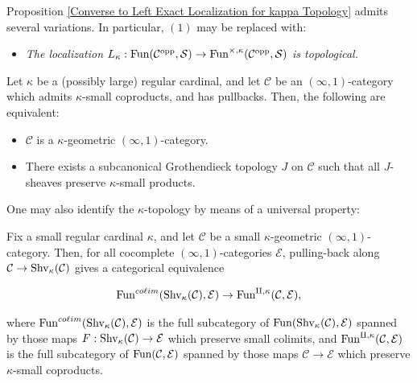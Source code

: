 \documentclass[10pt]{article}
\newcommand{\mS}{\mathcal S}
\newcommand{\C}{\mathcal C}
\newcommand{\cE}{\mathcal{E}}
\theoremstyle{witharg}
\theoremstyle{witharg}
\theoremstyle{witharg2}
\begin{document}
\begin{remark}{}

    Proposition \ref{Converse to Left Exact Localization for kappa Topology} admits several variations. In particular, $(1)$ may be replaced with:

    \begin{itemize}

        \item [$(1^\prime)$] \emph{The localization $L_\kappa:\textnormal{Fun}(\C^{\textnormal{opp}},\mS)\rightarrow \textnormal{Fun}^{\times,\kappa}(\C^{\textnormal{opp}},\mS)$ is topological.}
        
    \end{itemize}
    
    
\end{remark}


\begin{corollary}{}\label{kappa cats. through sheaves}


    Let $\kappa$ be a (possibly large) regular cardinal, and let $\C$ be an $(\infty,1)$-category which admits $\kappa$-small coproducts, and has pullbacks. Then, the following are equivalent:

    \begin{itemize}
        \item [$(1)$] $\C$ is a $\kappa$-geometric $(\infty,1)$-category. 

        \item [$(2)$] There exists a subcanonical Grothendieck topology $J$ on $\C$ such that all $J$-sheaves preserve $\kappa$-small products. 
        
    \end{itemize}
    
    
\end{corollary}







\noindent One may also identify the $\kappa$-topology by means of a universal property:


\begin{proposition}{}\label{Universal Property of the Disjoint Product Topology}

     Fix a small regular cardinal $\kappa$, and let $\C$ be a small $\kappa$-geometric $(\infty,1)$-category. Then, for all cocomplete $(\infty,1)$-categories $\cE$, pulling-back along $\C\rightarrow \textnormal{Shv}_{\kappa}(\C)$ gives a categorical equivalence 

     $$\textnormal{Fun}^{co \ell im}(\textnormal{Shv}_{\kappa}(\C),\cE)\rightarrow \textnormal{Fun}^{\amalg,\kappa}(\C,\cE),$$


     \noindent where $\textnormal{Fun}^{co \ell im}(\textnormal{Shv}_{\kappa}(\C),\cE)$ is the full subcategory of $\textnormal{Fun}(\textnormal{Shv}_{\kappa}(\C),\cE)$ spanned by those maps $F:\textnormal{Shv}_{\kappa}(\C)\rightarrow \cE$ which preserve small colimits, and $\textnormal{Fun}^{\amalg,\kappa}(\C,\cE)$ is the full subcategory of $\textnormal{Fun}(\C,\cE)$ spanned by those maps $\C\rightarrow \cE$ which preserve $\kappa$-small coproducts.

\end{proposition}
\end{document}
